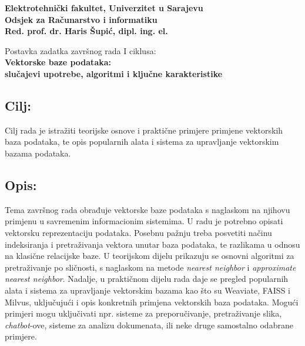 \pagebreak
\thispagestyle{plain}

\begin{flushleft}
    \textbf{Elektrotehnički fakultet, Univerzitet u Sarajevu}\\
    \textbf{Odsjek za Računarstvo i informatiku}\\
    \textbf{Red. prof. dr. Haris Šupić, dipl. ing. el.}\\
\end{flushleft}

\begin{center}
    \vspace{2cm}
    {\Large Postavka zadatka završnog rada I ciklusa:}\\[0.2cm]
    {\large \textbf{Vektorske baze podataka:\\slučajevi upotrebe, algoritmi i ključne karakteristike}}
    \vspace{1cm}
\end{center}

\subsection*{Cilj:}

Cilj rada je istražiti teorijske osnove i praktične primjere primjene vektorskih baza podataka, te opis popularnih alata i sistema za upravljanje vektorskim bazama podataka.

\subsection*{Opis:}

Tema završnog rada obrađuje vektorske baze podataka s naglaskom na njihovu primjenu u savremenim informacionim sistemima. U radu je potrebno opisati vektorsku reprezentaciju podataka. Posebnu pažnju treba posvetiti načinu indeksiranja i pretraživanja vektora unutar baza podataka, te razlikama u odnosu na klasične relacijske baze. U teorijskom dijelu prikazuju se osnovni algoritmi za pretraživanje po sličnosti, s naglaskom na metode \textit{nearest neighbor} i \textit{approximate nearest neighbor}. Nadalje, u praktičnom dijelu rada daje se pregled popularnih alata i sistema za upravljanje vektorskim bazama kao što su Weaviate, FAISS i Milvus, uključujući i opis konkretnih primjena vektorskih baza podataka. Mogući primjeri mogu uključivati npr. sisteme za preporučivanje, pretraživanje slika, \textit{chatbot}-ove, sisteme za analizu dokumenata, ili neke druge samostalno odabrane primjere.

